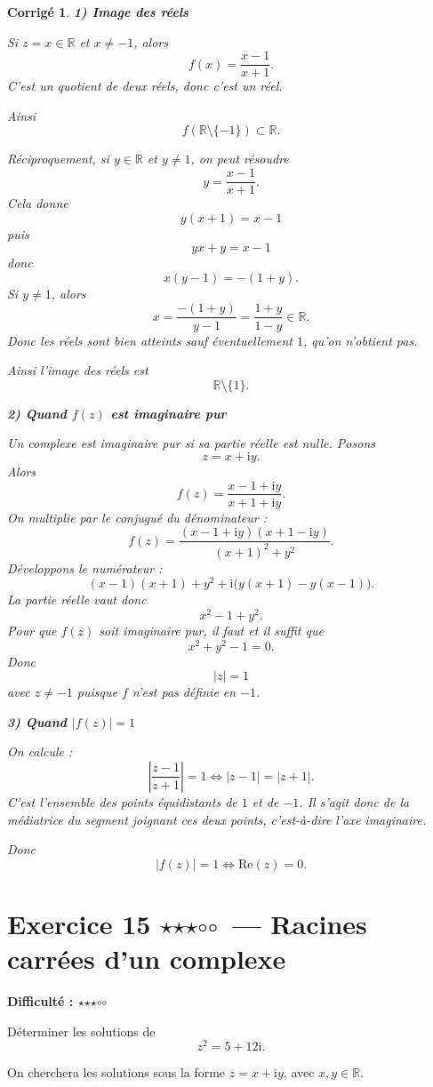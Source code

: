\documentclass[11pt,a4paper]{article}
\newtheorem*{corrige}{Corrigé}
\newcommand{\R}{\mathbb{R}}
\newcommand{\ii}{\mathrm{i}}
\newcommand{\Ree}{\mathrm{Re}}
\newcommand{\fullstar}{\(\star\)}
\newcommand{\emptystar}{\(\circ\)}
\newcommand{\threeStars}{\fullstar\fullstar\fullstar\emptystar\emptystar}
\newcommand{\difficulty}[1]{\textbf{Difficulté : #1}}
\begin{document}
\begin{corrige}
\textbf{1) Image des réels}

Si \(z=x\in\R\) et \(x\neq -1\), alors
\[
f(x)=\frac{x-1}{x+1}.
\]
C'est un quotient de deux réels, donc c'est un réel.

Ainsi
\[
\boxed{f(\R\setminus\{-1\})\subset \R}.
\]

Réciproquement, si \(y\in\R\) et \(y\neq 1\), on peut résoudre
\[
y=\frac{x-1}{x+1}.
\]
Cela donne
\[
y(x+1)=x-1
\]
puis
\[
yx+y=x-1
\]
donc
\[
x(y-1)=-(1+y).
\]
Si \(y\neq 1\), alors
\[
x=\frac{-(1+y)}{y-1}=\frac{1+y}{1-y}\in\R.
\]
Donc les réels sont bien atteints sauf éventuellement \(1\), qu'on n'obtient pas.

Ainsi l'image des réels est
\[
\boxed{\R\setminus\{1\}}.
\]

\textbf{2) Quand \(f(z)\) est imaginaire pur}

Un complexe est imaginaire pur si sa partie réelle est nulle. Posons
\[
z=x+\ii y.
\]
Alors
\[
f(z)=\frac{x-1+\ii y}{x+1+\ii y}.
\]
On multiplie par le conjugué du dénominateur :
\[
f(z)=\frac{(x-1+\ii y)(x+1-\ii y)}{(x+1)^2+y^2}.
\]
Développons le numérateur :
\[
(x-1)(x+1)+y^2+\ii\big(y(x+1)-y(x-1)\big).
\]
La partie réelle vaut donc
\[
x^2-1+y^2.
\]
Pour que \(f(z)\) soit imaginaire pur, il faut et il suffit que
\[
x^2+y^2-1=0.
\]
Donc
\[
\boxed{|z|=1}
\]
avec \(z\neq -1\) puisque \(f\) n'est pas définie en \(-1\).

\textbf{3) Quand \(|f(z)|=1\)}

On calcule :
\[
\left|\frac{z-1}{z+1}\right|=1
\iff |z-1|=|z+1|.
\]
C'est l'ensemble des points équidistants de \(1\) et de \(-1\). Il s'agit donc de la médiatrice du segment joignant ces deux points, c'est-à-dire l'axe imaginaire.

Donc
\[
\boxed{|f(z)|=1 \iff \Ree(z)=0.}
\]
\end{corrige}

\section{Exercice 15 \threeStars\ --- Racines carrées d'un complexe}
\difficulty{\threeStars}

Déterminer les solutions de
\[
z^2=5+12\ii.
\]

On cherchera les solutions sous la forme \(z=x+\ii y\), avec \(x,y\in\R\).
\end{document}

